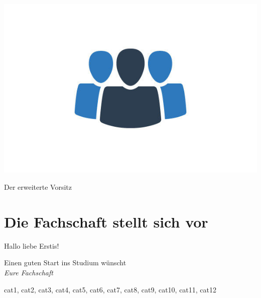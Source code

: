 \begin{wrapstuff}[type=figure, r, width=0.5\textwidth, top=1]
    \setlength{\abovecaptionskip}{8pt plus 3pt minus 2pt}
    \centering
    \includegraphics[width=\textwidth]{./content/photos/vorsitz.jpg}
    \caption*{Der erweiterte Vorsitz}
\end{wrapstuff}

\section{Die Fachschaft stellt sich vor}

Hallo liebe Erstis!

\lipsum[1-3]

Einen guten Start ins Studium wünscht \\
\textit{Eure Fachschaft}

\newpage

{%
    cat1,
    cat2,
    cat3,
    cat4,
    cat5,
    cat6,
    cat7,
    cat8,
    cat9,
    cat10,
    cat11,
    cat12%
}%